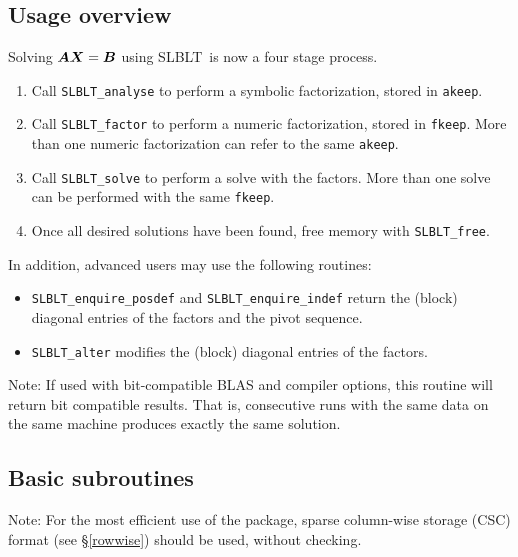 \documentclass{galahad}
\newcommand{\packagename}{SLBLT}
\begin{document}
\subsection{Usage overview}
\label{usage-overview}

Solving ${\bm{A}}{\bm{X}}={\bm{B}}$ using \packagename\ is now a four stage process.
\begin{enumerate}
\item
Call {\tt \packagename\_analyse} to perform a symbolic factorization, stored
in {\tt akeep}.

\item
Call {\tt \packagename\_factor} to perform a numeric factorization, stored in
{\tt fkeep}. More than one numeric factorization can refer to the same 
{\tt akeep}.

\item
Call {\tt \packagename\_solve} to perform a solve with the factors. More than
one solve can be performed with the same {\tt fkeep}.

\item
Once all desired solutions have been found, free memory with
{\tt \packagename\_free}.

\end{enumerate}

In addition, advanced users may use the following routines:
\begin{itemize}
\item
{\tt \packagename\_enquire\_posdef} and 
{\tt \packagename\_enquire\_indef} return
the (block) diagonal entries of the factors and the pivot sequence.

\item
{\tt \packagename\_alter} modifies the (block) diagonal entries of the factors.
\end{itemize}

Note:
If used with bit-compatible BLAS and compiler options, this routine will
return bit compatible results. That is, consecutive runs with the same data
on the same machine produces exactly the same solution.

\subsection{Basic subroutines}
\label{basic-subroutines}

Note:
For the most efficient use of the package, sparse column-wise storage (CSC) 
format (see \S\ref{rowwise}) should be used, without checking.

\end{document}
